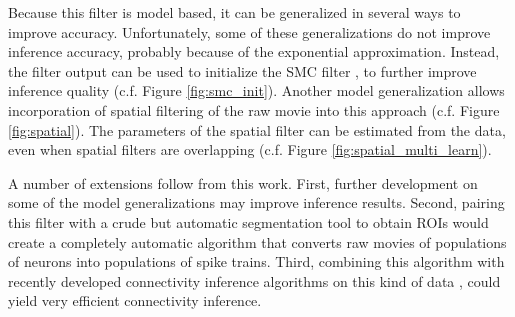 Because this filter is model based, it can be generalized in several ways to improve accuracy.  Unfortunately, some of these generalizations do not improve inference accuracy, probably because of the exponential approximation.  Instead, the \foopsi filter output can be used to initialize the SMC filter \cite{VogelsteinPaninski09}, to further improve inference quality (c.f. Figure \ref{fig:smc_init}).  Another model generalization allows incorporation of spatial filtering of the raw movie into this approach (c.f. Figure \ref{fig:spatial}).  The parameters of the spatial filter can be estimated from the data, even when spatial filters are overlapping (c.f. Figure \ref{fig:spatial_multi_learn}).

A number of extensions follow from this work.  First, further development on some of the model generalizations may improve inference results. Second, pairing this filter with a crude but automatic segmentation tool to obtain ROIs would create a completely automatic algorithm that converts raw movies of populations of neurons into populations of spike trains.  Third, combining this algorithm with recently developed connectivity inference algorithms on this kind of data \cite{MishchenkoPaninski09}, could yield very efficient connectivity inference.